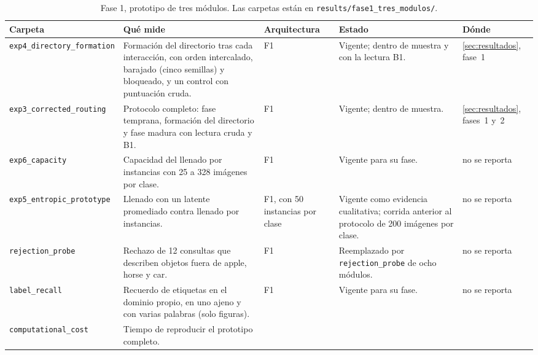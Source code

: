 \begin{table}[H]
\centering
\caption[Fase 1, prototipo de tres módulos]{Fase 1, prototipo de tres módulos. Las carpetas están en \texttt{results/fase1\_\allowbreak tres\_\allowbreak modulos/}.}
\label{tab:fase1-experimentos}
\footnotesize
\setlength{\tabcolsep}{3pt}
\begin{tabular}{p{3.1cm}p{4.7cm}p{2.0cm}p{3.1cm}p{1.6cm}}
\toprule
Carpeta & Qué mide & Arquitectura & Estado & Dónde \tabularnewline
\midrule
\raggedright \texttt{exp4\_\allowbreak directory\_\allowbreak formation} &
\raggedright Formación del directorio tras cada interacción, con orden intercalado, barajado (cinco semillas) y bloqueado, y un control con puntuación cruda. &
\raggedright F1 &
\raggedright Vigente; dentro de muestra y con la lectura B1. &
\raggedright \ref{sec:resultados}, fase~1 \tabularnewline\addlinespace[4pt]
\raggedright \texttt{exp3\_\allowbreak corrected\_\allowbreak routing} &
\raggedright Protocolo completo: fase temprana, formación del directorio y fase madura con lectura cruda y B1. &
\raggedright F1 &
\raggedright Vigente; dentro de muestra. &
\raggedright \ref{sec:resultados}, fases~1 y~2 \tabularnewline\addlinespace[4pt]
\raggedright \texttt{exp6\_\allowbreak capacity} &
\raggedright Capacidad del llenado por instancias con 25 a 328 imágenes por clase. &
\raggedright F1 &
\raggedright Vigente para su fase. &
\raggedright no se reporta \tabularnewline\addlinespace[4pt]
\raggedright \texttt{exp5\_\allowbreak entropic\_\allowbreak prototype} &
\raggedright Llenado con un latente promediado contra llenado por instancias. &
\raggedright F1, con 50 instancias por clase &
\raggedright Vigente como evidencia cualitativa; corrida anterior al protocolo de 200 imágenes por clase. &
\raggedright no se reporta \tabularnewline\addlinespace[4pt]
\raggedright \texttt{rejection\_\allowbreak probe} &
\raggedright Rechazo de 12 consultas que describen objetos fuera de apple, horse y car. &
\raggedright F1 &
\raggedright Reemplazado por \texttt{rejection\_\allowbreak probe} de ocho módulos. &
\raggedright no se reporta \tabularnewline\addlinespace[4pt]
\raggedright \texttt{label\_\allowbreak recall} &
\raggedright Recuerdo de etiquetas en el dominio propio, en uno ajeno y con varias palabras (solo figuras). &
\raggedright F1 &
\raggedright Vigente para su fase. &
\raggedright no se reporta \tabularnewline\addlinespace[4pt]
\raggedright \texttt{computational\_\allowbreak cost} &
\raggedright Tiempo de reproducir el prototipo completo. &

\end{tabular}
\end{table}
